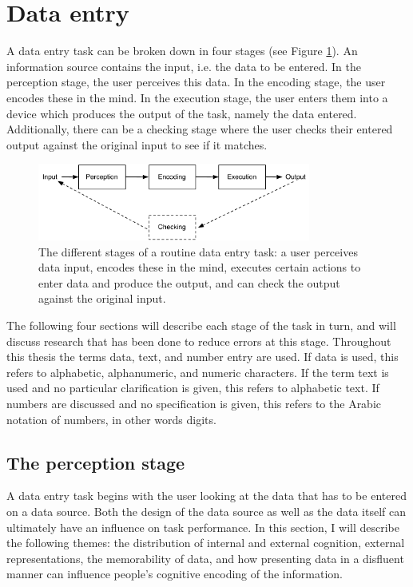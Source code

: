 \documentclass[11pt,oneside]{report}
\begin{document}
\section{Data entry}
A data entry task can be broken down in four stages (see Figure \ref{fig:ch2_hip}). An information source contains the input, i.e. the data to be entered. In the perception stage, the user perceives this data. In the encoding stage, the user encodes these in the mind. In the execution stage, the user enters them into a device which produces the output of the task, namely the data entered. Additionally, there can be a checking stage where the user checks their entered output against the original input to see if it matches.

\begin{figure}[!ht]
\centering
\includegraphics[width=0.8\textwidth]{images/HIP.pdf}
\caption{The different stages of a routine data entry task: a user perceives data input, encodes these in the mind, executes certain actions to enter data and produce the output, and can check the output against the original input.}
\vspace{-3pt}
\label{fig:ch2_hip}
\end{figure}

The following four sections will describe each stage of the task in turn, and will discuss research that has been done to reduce errors at this stage. 
Throughout this thesis the terms data, text, and number entry are used. If data is used, this refers to alphabetic, alphanumeric, and numeric characters. 
If the term text is used and no particular clarification is given, this refers to alphabetic text. If numbers are discussed and no specification is given, this refers to the Arabic notation of numbers, in other words digits. 

\subsection{The perception stage}
A data entry task begins with the user looking at the data that has to be entered on a data source.
Both the design of the data source as well as the data itself can ultimately have an influence on task performance. In this section, I will describe the following themes: the distribution of internal and external cognition, external representations, the memorability of data, and how presenting data in a disfluent manner can influence people's cognitive encoding of the information.
\end{document}
